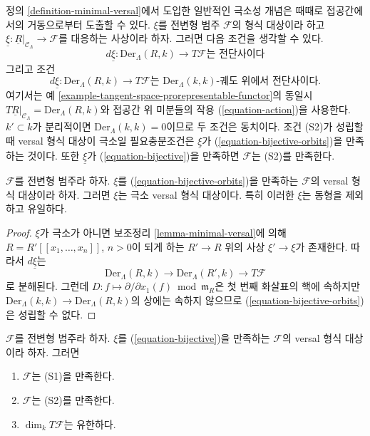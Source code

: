 \noindent
정의 \ref{definition-minimal-versal}에서 도입한 일반적인 극소성 개념은
때때로 접공간에서의 거동으로부터 도출할 수 있다.
$\xi$를 전변형 범주 $\mathcal{F}$의 형식 대상이라 하고
$\underline{\xi} : \underline{R}|_{\mathcal{C}_\Lambda} \to \mathcal{F}$를
대응하는 사상이라 하자. 그러면 다음 조건을 생각할 수 있다. %
\begin{equation}
\label{equation-bijective}
d\underline{\xi} : \text{Der}_\Lambda(R, k) \to T\mathcal{F}
\text{는 전단사이다}
\end{equation}
그리고 조건
\begin{equation}
\label{equation-bijective-orbits}
d\underline{\xi} : \text{Der}_\Lambda(R, k) \to T\mathcal{F}
\text{는 }\text{Der}_\Lambda(k, k)\text{-궤도 위에서 전단사이다.}
\end{equation}
여기서는 예 \ref{example-tangent-space-prorepresentable-functor}의 동일시
$T\underline{R}|_{\mathcal{C}_\Lambda} = \text{Der}_\Lambda(R, k)$와
접공간 위 미분들의 작용 (\ref{equation-action})을 사용한다.
$k' \subset k$가 분리적이면
$\text{Der}_\Lambda(k, k) = 0$이므로 두 조건은 동치이다.
조건 (S2)가 성립할 때 versal 형식 대상이 극소일 필요충분조건은
$\underline{\xi}$가 (\ref{equation-bijective-orbits})을 만족하는 것이다.
또한 $\underline{\xi}$가 (\ref{equation-bijective})을 만족하면
$\mathcal{F}$는 (S2)를 만족한다.

\begin{lemma}
\label{lemma-miniversal-object-unique}
$\mathcal{F}$를 전변형 범주라 하자.
$\xi$를 (\ref{equation-bijective-orbits})을 만족하는
$\mathcal{F}$의 versal 형식 대상이라 하자.
그러면 $\xi$는 극소 versal 형식 대상이다.
특히 이러한 $\xi$는 동형을 제외하고 유일하다.
\end{lemma}

\begin{proof}
$\xi$가 극소가 아니면 보조정리 \ref{lemma-minimal-versal}에 의해
$R = R'[[x_1, \ldots, x_n]]$, $n > 0$이 되게 하는
$R' \to R$ 위의 사상 $\xi' \to \xi$가 존재한다.
따라서 $d\underline{\xi}$는
$$
\text{Der}_\Lambda(R, k) \to
\text{Der}_\Lambda(R', k) \to T\mathcal{F}
$$
로 분해된다. 그런데
$D : f \mapsto \partial/\partial x_1(f) \bmod \mathfrak m_R$은
첫 번째 화살표의 핵에 속하지만
$\text{Der}_\Lambda(k, k) \to \text{Der}_\Lambda(R, k)$의 상에는
속하지 않으므로 (\ref{equation-bijective-orbits})은 성립할 수 없다.
\end{proof}

\begin{lemma}
\label{lemma-miniversal-object-existence-1}
$\mathcal{F}$를 전변형 범주라 하자.
$\xi$를 (\ref{equation-bijective})을 만족하는
$\mathcal{F}$의 versal 형식 대상이라 하자. 그러면
\begin{enumerate}
\item $\mathcal{F}$는 (S1)을 만족한다.
\item $\mathcal{F}$는 (S2)를 만족한다.
\item $\dim_k T\mathcal{F}$는 유한하다.
\end{enumerate}
\end{lemma}

